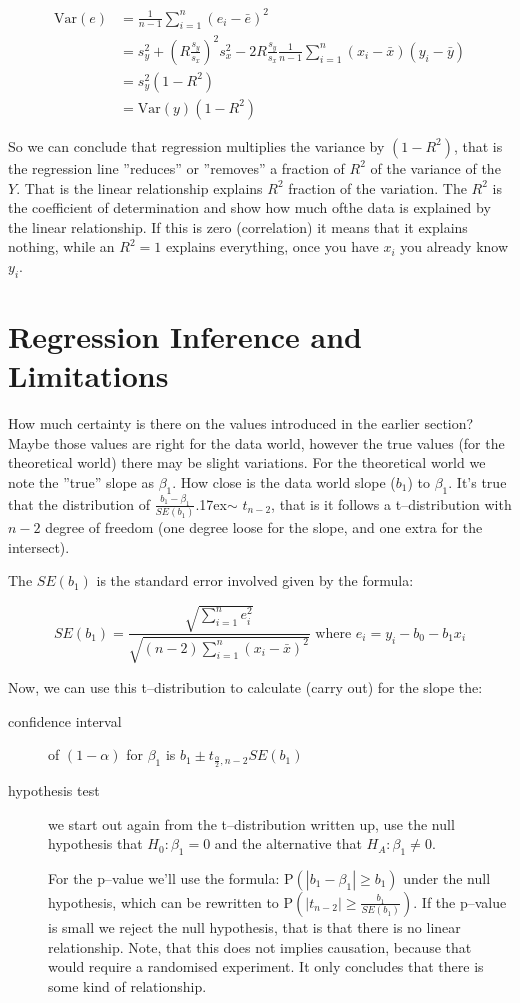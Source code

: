 \begin{align*}
\mbox{Var} (e)&=\frac{1}{n-1}\sum_{i=1}^{n} (e_i -
\bar{e})^2 \\ 
&= s_y^2 + (R \frac{s_y}{s_x})^2 s_x^2 - 2 R \frac{s_y}{s_x}
\frac{1}{n-1} \sum_{i=1}^{n} (x_i - \bar{x})(y_i - \bar{y}) \\
&= s_y^2 (1-R^2)\\
&= \mbox{Var}(y)(1-R^2)
\end{align*} 

So we can conclude that regression multiplies the variance by $(1-R^2)$, that is
the regression line ''reduces'' or ''removes'' a fraction of $R^2$ of the
variance of the $Y$. That is the linear relationship explains $R^2$ fraction of
the variation. The $R^2$ is the coefficient of determination and show how much
ofthe data is explained by the linear relationship. If this is zero
(correlation) it means that it explains nothing, while an $R^2=1$ explains
everything, once you have $x_i$ you already know $y_i$. 


\section{Regression Inference and Limitations}

How much certainty is there on the values introduced in the earlier section?
Maybe those values are right for the data world, however the true values (for
the theoretical world) there may be slight variations. For the theoretical world
we note the ''true'' slope as $\beta_1$. How close is the data world slope
($b_1$) to $\beta_1$. It's true that the distribution of
$\frac{b_1-\beta_1}{SE(b_1)} ${\raise.17ex\hbox{$\scriptstyle\sim$}} $ t_{n-2}$,
that is it follows a t--distribution with $n-2$ degree of freedom (one degree
loose for the slope, and one extra for the intersect). 

The $SE(b_1)$ is the standard error involved given by the formula:

\[ SE(b_1) = \frac{\sqrt{\sum_{i=1}^n e_i^2}}{\sqrt{(n-2) \sum_{i=1}^n (x_i -
\bar{x})^2 }} \mbox{ where } e_i = y_i -b_0 - b_1 x_i
\]

Now, we can use this t--distribution to calculate (carry out) for the slope the: 

\begin{description}
  \item[confidence interval] of $(1-\alpha)$ for $\beta_1$ is $b_1 \pm
t_{\frac{\alpha}{2}, n-2} SE(b_1)$
	\item[hypothesis test] we start out again from
the t--distribution written up, use the null hypothesis that $H_0: \beta_1 = 0$
and the alternative that $H_A: \beta_1 \neq 0$.

For the p--value we'll use the formula: P$(|b_1-\beta_1| \geq b_1)$ under the
null hypothesis, which can be rewritten to P$\left(|t_{n-2}| \geq
\frac{b_1}{SE(b_1)}\right)$. If the p--value is small we reject the null
hypothesis, that is that there is no linear relationship. Note, that this does
not implies causation, because that would require a randomised experiment. It
only concludes that there is some kind of relationship.
\end{description}
 
